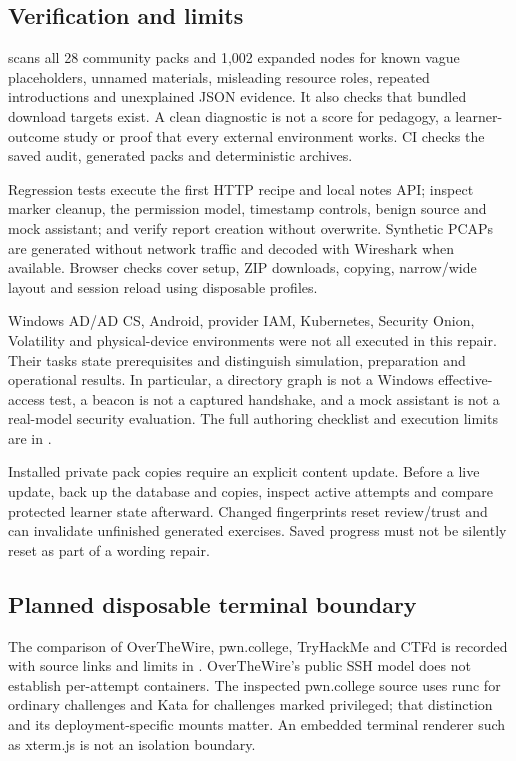 \subsection{Verification and limits}
 scans all 28 community packs and 1,002
expanded nodes for known vague placeholders, unnamed materials, misleading
resource roles, repeated introductions and unexplained JSON evidence. It also
checks that bundled download targets exist. A clean diagnostic is not a score for
pedagogy, a learner-outcome study or proof that every external environment works.
CI checks the saved audit, generated packs and deterministic archives.

Regression tests execute the first HTTP recipe and local notes API; inspect
marker cleanup, the permission model, timestamp controls, benign source and mock
assistant; and verify report creation without overwrite. Synthetic PCAPs are
generated without network traffic and decoded with Wireshark when available.
Browser checks cover setup, ZIP downloads, copying, narrow/wide layout and session
reload using disposable profiles.

Windows AD/AD CS, Android, provider IAM, Kubernetes, Security Onion, Volatility and
physical-device environments were not all executed in this repair. Their tasks
state prerequisites and distinguish simulation, preparation and operational
results. In particular, a directory graph is not a Windows effective-access test,
a beacon is not a captured handshake, and a mock assistant is not a real-model
security evaluation. The full authoring checklist and execution limits are in
.

Installed private pack copies require an explicit content update. Before a live
update, back up the database and copies, inspect active attempts and compare
protected learner state afterward. Changed fingerprints reset review/trust and
can invalidate unfinished generated exercises. Saved progress must not be
silently reset as part of a wording repair.

\subsection{Planned disposable terminal boundary}
The comparison of OverTheWire, pwn.college, TryHackMe and CTFd is recorded with
source links and limits in . OverTheWire's
public SSH model does not establish per-attempt containers. The inspected
pwn.college source uses runc for ordinary challenges and Kata for challenges
marked privileged; that distinction and its deployment-specific mounts matter.
An embedded terminal renderer such as xterm.js is not an isolation boundary.

